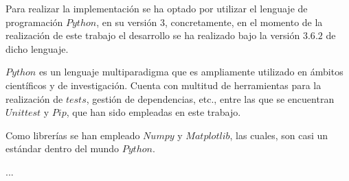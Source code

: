 Para realizar la implementación se ha optado por utilizar el lenguaje de programación $Python$, en
su versión 3, concretamente, en el momento de la realización de este trabajo el desarrollo se ha realizado
bajo la versión $3.6.2$ de dicho lenguaje.

$Python$ es un lenguaje multiparadigma que es ampliamente utilizado en ámbitos científicos y de investigación.
Cuenta con multitud de herramientas para la realización de $tests$, gestión de dependencias, etc., entre las
que se encuentran $Unittest$ y $Pip$, que han sido empleadas en este trabajo.

Como librerías se han empleado $Numpy$ y $Matplotlib$, las cuales, son casi un estándar dentro
del mundo $Python$.

...
